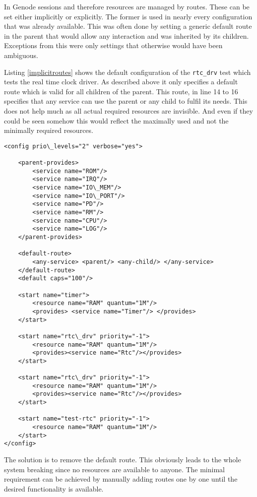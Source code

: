 \documentclass[
a4paper,
12pt,
notitlepage,
parskip=half,
DIV=11,
]{scrbook}
\begin{document}
		In Genode sessions and therefore resources are managed by routes.
		These can be set either implicitly or explicitly.
		The former is used in nearly every configuration that was already available.
		This was often done by setting a generic default route in the parent that would allow any interaction and was inherited by its children.
		Exceptions from this were only settings that otherwise would have been ambiguous.
		
		Listing \ref{implicitroutes} shows the default configuration of the \texttt{rtc\_drv} test which tests the real time clock driver.
		As described above it only specifies a default route which is valid for all children of the parent.
		This route, in line 14 to 16 specifies that any service can use the parent or any child to fulfil its needs.
		This does not help much as all actual required resources are invisible.
		And even if they could be seen somehow this would reflect the maximally used and not the minimally required resources.
		
		\begin{lstlisting}
<config prio\_levels="2" verbose="yes">
		
	<parent-provides>
		<service name="ROM"/>
		<service name="IRQ"/>
		<service name="IO\_MEM"/>
		<service name="IO\_PORT"/>
		<service name="PD"/>
		<service name="RM"/>
		<service name="CPU"/>
		<service name="LOG"/>
	</parent-provides>
		
	<default-route>
		<any-service> <parent/> <any-child/> </any-service>
	</default-route>
	<default caps="100"/>
		
	<start name="timer">
		<resource name="RAM" quantum="1M"/>
		<provides> <service name="Timer"/> </provides>
	</start>
		
	<start name="rtc\_drv" priority="-1">
		<resource name="RAM" quantum="1M"/>
		<provides><service name="Rtc"/></provides>
	</start>
		
	<start name="rtc\_drv" priority="-1">
		<resource name="RAM" quantum="1M"/>
		<provides><service name="Rtc"/></provides>
	</start>
		
	<start name="test-rtc" priority="-1">
		<resource name="RAM" quantum="1M"/>
	</start>
</config>
		\end{lstlisting}
		
		The solution is to remove the default route.
		This obviously leads to the whole system breaking since no resources are available to anyone.
		The minimal requirement can be achieved by manually adding routes one by one until the desired functionality is available.
		
\end{document}

